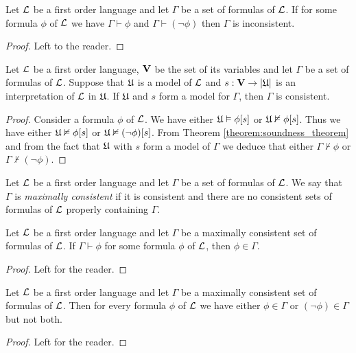 \begin{proposition}\label{proposition:form_of_excluded_middle_for_consistent}
Let ${\mathcal L}$ be a first order language and let $\Gamma$ be a set of formulas of ${\mathcal L}$. If for some formula $\phi$ of ${\mathcal L}$ we have $\Gamma \vdash \phi$ and $\Gamma \vdash (\neg \phi)$ then $\Gamma$ is inconsistent.
\end{proposition}
\begin{proof}
Left to the reader.
\end{proof}

\begin{proposition}
Let ${\mathcal L}$ be a first order language, $\mathbf{V}$ be the set of its variables and let $\Gamma$ be a set of formulas of ${\mathcal L}$. Suppose that ${\mathfrak U}$ is a model of ${\mathcal L}$ and $s:\mathbf{V}\rightarrow |{\mathfrak U}|$ is an interpretation of ${\mathcal L}$ in ${\mathfrak U}$. If ${\mathfrak U}$ and $s$ form a model for $\Gamma$, then $\Gamma$ is consistent.
\end{proposition}
\begin{proof}
Consider a formula $\phi$ of ${\mathcal L}$. We have either ${\mathfrak U} \vDash \phi[s]$ or ${\mathfrak U} \nvDash \phi[s]$. Thus we have either ${\mathfrak U} \nvDash \phi[s]$ or ${\mathfrak U} \nvDash (\neg \phi)[s]$. From Theorem \ref{theorem:soundness_theorem} and from the fact that ${\mathfrak U}$ with $s$ form a model of $\Gamma$ we deduce that either $\Gamma \nvdash \phi$ or $\Gamma \nvdash (\neg \phi)$.
\end{proof}

\begin{definition}
Let ${\mathcal L}$ be a first order language and let $\Gamma$ be a set of formulas of ${\mathcal L}$. We say that $\Gamma$ is \textit{maximally consistent} if it is consistent and there are no consistent sets of formulas of ${\mathcal L}$ properly containing $\Gamma$.
\end{definition}

\begin{proposition}
Let ${\mathcal L}$ be a first order language and let $\Gamma$ be a maximally consistent set of formulas of ${\mathcal L}$. If $\Gamma \vdash \phi$ for some formula $\phi$ of ${\mathcal L}$, then $\phi \in \Gamma$.
\end{proposition}
\begin{proof}
Left for the reader.
\end{proof}

\begin{proposition}
Let ${\mathcal L}$ be a first order language and let $\Gamma$ be a maximally consistent set of formulas of ${\mathcal L}$. Then for every formula $\phi$ of ${\mathcal L}$ we have either $\phi \in \Gamma$ or $(\neg \phi)\in \Gamma$ but not both.
\end{proposition}
\begin{proof}
Left for the reader.
\end{proof}

